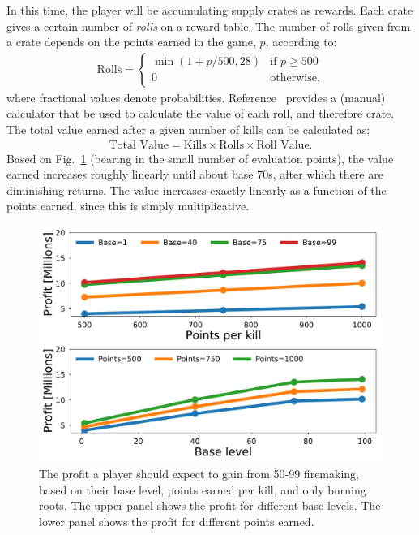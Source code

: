 		In this time, the player will be accumulating supply crates as rewards. Each crate gives a certain number of \emph{rolls} on a reward table. The number of rolls given from a crate depends on the points earned in the game, $p$, according to:
		\begin{align}
			\text{Rolls} = \begin{cases}
				\min(1 + p / 500, 28) & \text{if $p \ge 500$} \\
				0 & \text{otherwise},
			\end{cases}
		\end{align}
		where fractional values denote probabilities. Reference~\cite{wiki:wintertodt_supply_crates} provides a (manual) calculator that be used to calculate the value of each roll, and therefore crate. The total value earned after a given number of kills can be calculated as:
		\begin{align}
			\text{Total Value} = \text{Kills} \times \text{Rolls} \times \text{Roll Value}.
		\end{align}
		Based on Fig.~\ref{fig:wintertodt_profit} (bearing in the small number of evaluation points), the value earned increases roughly linearly until about base 70s, after which there are diminishing returns. The value increases exactly linearly as a function of the points earned, since this is simply multiplicative.

		\begin{figure}
			\centering
			\includegraphics[width=\linewidth]{examples/firemaking/profit.pdf}
			\caption{
				The profit a player should expect to gain from 50-99 firemaking, based on their base level, points earned per kill, and only burning roots. The upper panel shows the profit for different base levels. The lower panel shows the profit for different points earned.
			}
			\label{fig:wintertodt_profit}
		\end{figure}

